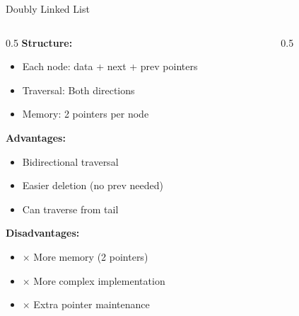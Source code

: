 \documentclass[aspectratio=169,xcolor=dvipsnames]{beamer}
\begin{document}
\begin{frame}{Doubly Linked List}
  \begin{columns}
    \begin{column}{0.5\textwidth}
      \textbf{Structure:}
      \begin{itemize}
        \item Each node: data + next + prev pointers
        \item Traversal: Both directions
        \item Memory: 2 pointers per node
      \end{itemize}

      \vspace{0.3cm}
      \textbf{Advantages:}
      \begin{itemize}
        \item \checkmark Bidirectional traversal
        \item \checkmark Easier deletion (no prev needed)
        \item \checkmark Can traverse from tail
      \end{itemize}

      \vspace{0.3cm}
      \textbf{Disadvantages:}
      \begin{itemize}
        \item $\times$ More memory (2 pointers)
        \item $\times$ More complex implementation
        \item $\times$ Extra pointer maintenance
      \end{itemize}
    \end{column}

    \begin{column}{0.5\textwidth}
      \begin{center}
\end{center}
\end{column}
\end{columns}
\end{frame}
\end{document}
